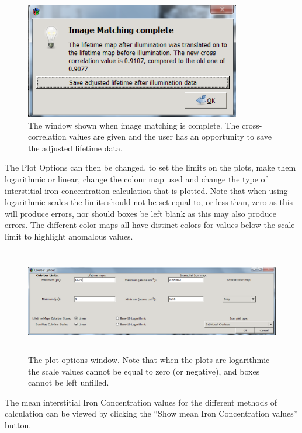 \documentclass[final,a4paper,oneside,12pt]{article}
\begin{document}
\begin{figure}[h!]
\includegraphics[height=2in]{2imagematchingcomplete}
\caption{\label{figure2} The window shown when image matching is complete. The cross-correlation values are given and the user has an opportunity to save the adjusted lifetime data.}
\end{figure}

\pagebreak

The Plot Options can then be changed, to set the limits on the plots, make them logarithmic or linear, change the colour map used and change the type of interstitial iron concentration calculation that is plotted. Note that when using logarithmic scales the limits should not be set equal to, or less than, zero as this will produce errors, nor should boxes be left blank as this may also produce errors. The different color maps all have distinct colors for values below the scale limit to highlight anomalous values.

\begin{figure}[h!]
\includegraphics[height=1.8in]{editcolorbar}
\caption{\label{figure2} The plot options window. Note that when the plots are logarithmic the scale values cannot be equal to zero (or negative), and boxes cannot be left unfilled.}
\end{figure}

The mean interstitial Iron Concentration values for the different methods of calculation can be viewed by clicking the ``Show mean Iron Concentration values'' button.
\end{document}
